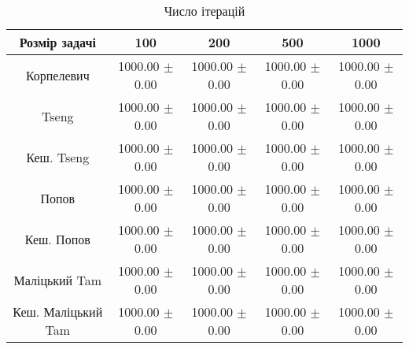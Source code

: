 \begin{table}[H]
	\centering
	\begin{tabular}{|c||c|c|c|c|}\hline
		Розмір задачі & 100 & 200 & 500 & 1000 \\ \hline \hline
		Корпелевич & 1000.00 $\pm$ 0.00 & 1000.00 $\pm$ 0.00 & 1000.00 $\pm$ 0.00 & 1000.00 $\pm$ 0.00 \\ \hline
		Tseng & 1000.00 $\pm$ 0.00 & 1000.00 $\pm$ 0.00 & 1000.00 $\pm$ 0.00 & 1000.00 $\pm$ 0.00 \\ \hline
		Кеш. Tseng & 1000.00 $\pm$ 0.00 & 1000.00 $\pm$ 0.00 & 1000.00 $\pm$ 0.00 & 1000.00 $\pm$ 0.00 \\ \hline
		Попов & 1000.00 $\pm$ 0.00 & 1000.00 $\pm$ 0.00 & 1000.00 $\pm$ 0.00 & 1000.00 $\pm$ 0.00 \\ \hline
		Кеш. Попов & 1000.00 $\pm$ 0.00 & 1000.00 $\pm$ 0.00 & 1000.00 $\pm$ 0.00 & 1000.00 $\pm$ 0.00 \\ \hline
		Маліцький Tam & 1000.00 $\pm$ 0.00 & 1000.00 $\pm$ 0.00 & 1000.00 $\pm$ 0.00 & 1000.00 $\pm$ 0.00 \\ \hline
		Кеш. Маліцький Tam & 1000.00 $\pm$ 0.00 & 1000.00 $\pm$ 0.00 & 1000.00 $\pm$ 0.00 & 1000.00 $\pm$ 0.00 \\ \hline
	\end{tabular}
	\caption{Число ітерацій}
\end{table}

